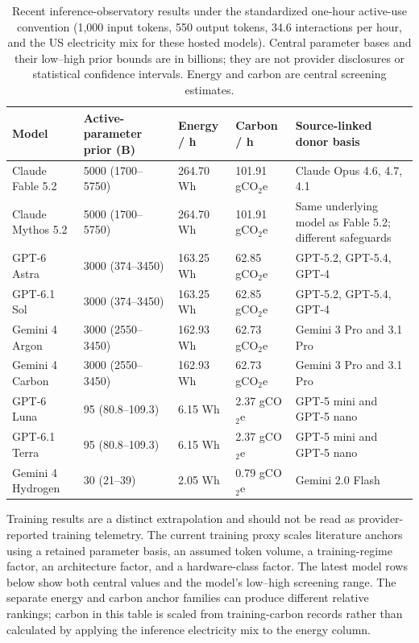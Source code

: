 \documentclass[11pt,a4paper]{article}
\begin{document}
\begin{table}[htbp]
\centering
\small
\begin{tabularx}{\textwidth}{|L{2.7cm}|L{2.6cm}|L{1.5cm}|L{1.8cm}|Y|}
\hline
Model & Active-parameter prior (B) & Energy / h & Carbon / h & Source-linked donor basis \\
\hline
Claude Fable 5.2 & 5000 (1700--5750) & 264.70 Wh & 101.91 gCO$_2$e & Claude Opus 4.6, 4.7, 4.1 \cite{anthropic_fablemythos2026} \\
\hline
Claude Mythos 5.2 & 5000 (1700--5750) & 264.70 Wh & 101.91 gCO$_2$e & Same underlying model as Fable 5.2; different safeguards \cite{anthropic_fablemythos2026} \\
\hline
GPT-6 Astra & 3000 (374--3450) & 163.25 Wh & 62.85 gCO$_2$e & GPT-5.2, GPT-5.4, GPT-4 \cite{openai_gpt6_astra2026} \\
\hline
GPT-6.1 Sol & 3000 (374--3450) & 163.25 Wh & 62.85 gCO$_2$e & GPT-5.2, GPT-5.4, GPT-4 \cite{openai_gpt61_sol2026} \\
\hline
Gemini 4 Argon & 3000 (2550--3450) & 162.93 Wh & 62.73 gCO$_2$e & Gemini 3 Pro and 3.1 Pro \cite{google_gemini4_carbon2026} \\
\hline
Gemini 4 Carbon & 3000 (2550--3450) & 162.93 Wh & 62.73 gCO$_2$e & Gemini 3 Pro and 3.1 Pro \cite{google_gemini4_carbon2026} \\
\hline
GPT-6 Luna & 95 (80.8--109.3) & 6.15 Wh & 2.37 gCO$_2$e & GPT-5 mini and GPT-5 nano \cite{openai_gpt6_solluna2026} \\
\hline
GPT-6.1 Terra & 95 (80.8--109.3) & 6.15 Wh & 2.37 gCO$_2$e & GPT-5 mini and GPT-5 nano \cite{openai_gpt61_terra2026} \\
\hline
Gemini 4 Hydrogen & 30 (21--39) & 2.05 Wh & 0.79 gCO$_2$e & Gemini 2.0 Flash \cite{google_gemini4_hydrogen2026} \\
\hline
\end{tabularx}
\caption{Recent inference-observatory results under the standardized one-hour active-use convention (1,000 input tokens, 550 output tokens, 34.6 interactions per hour, and the US electricity mix for these hosted models). Central parameter bases and their low--high prior bounds are in billions; they are not provider disclosures or statistical confidence intervals. Energy and carbon are central screening estimates.}
\label{tab:observatory-inference}
\end{table}

Training results are a distinct extrapolation and should not be read as provider-reported training telemetry. The current training proxy scales literature anchors using a retained parameter basis, an assumed token volume, a training-regime factor, an architecture factor, and a hardware-class factor. The latest model rows below show both central values and the model's low--high screening range. The separate energy and carbon anchor families can produce different relative rankings; carbon in this table is scaled from training-carbon records rather than calculated by applying the inference electricity mix to the energy column.
\end{document}

